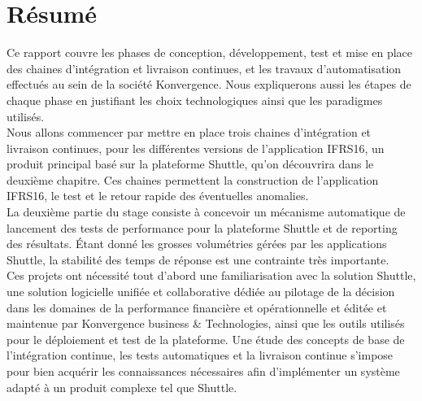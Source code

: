 \chapter*{Résumé}

Ce rapport couvre les phases de conception, développement, test et mise en place des chaines d'intégration et livraison continues, et les travaux d'automatisation effectués au sein de la société Konvergence. Nous expliquerons aussi les étapes de chaque phase en justifiant les choix technologiques ainsi que les paradigmes utilisés.\\ 

Nous allons commencer par mettre en place trois chaines d'intégration et livraison continues, pour les différentes versions de l'application IFRS16, un produit principal basé sur la plateforme Shuttle, qu'on découvrira dans le deuxième chapitre. Ces chaines permettent la construction de l'application IFRS16, le test et le retour rapide des éventuelles anomalies.\\

La deuxième partie du stage consiste à concevoir un mécanisme automatique de lancement des tests de performance pour la plateforme Shuttle et de reporting des résultats. Étant donné les grosses volumétries gérées par les applications Shuttle, la stabilité des temps de réponse est une contrainte très importante.\\

Ces projets ont nécessité tout d’abord une familiarisation avec la solution Shuttle, une solution logicielle unifiée et collaborative dédiée au pilotage de la décision dans les domaines de la performance financière et opérationnelle et éditée et maintenue par Konvergence business \& Technologies, ainsi que les outils utilisés pour le déploiement et test de la plateforme. Une étude des concepts de base de l’intégration continue, les tests automatiques et la livraison continue s'impose pour bien acquérir les connaissances nécessaires afin d'implémenter un système adapté à un produit complexe tel que Shuttle.\\